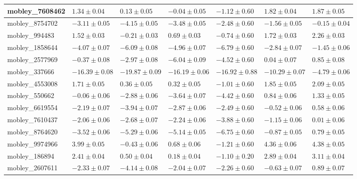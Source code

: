 \documentclass{article}
\begin{document}
\begin{landscape}
\begin{longtable}{|l{3.0cm}|l{3.0cm}|l{3.2cm}|l{3.6cm}|l{3.0cm}|l{3.0cm}|l{3.0cm}|}
mobley\_7608462	&	$	1.34	\pm	0.04	$	&	$	0.13	\pm	0.05	$	&	$	-0.04	\pm	0.05	$	&	$	-1.12	\pm	0.60	$	&	$	1.82	\pm	0.04	$	&	$	1.87	\pm	0.05	$	\\ \hline
mobley\_8754702	&	$	-3.11	\pm	0.05	$	&	$	-4.15	\pm	0.05	$	&	$	-3.48	\pm	0.05	$	&	$	-2.48	\pm	0.60	$	&	$	-1.56	\pm	0.05	$	&	$	-0.15	\pm	0.04	$	\\ \hline
mobley\_994483	&	$	1.52	\pm	0.03	$	&	$	-0.21	\pm	0.03	$	&	$	0.69	\pm	0.03	$	&	$	-0.74	\pm	0.60	$	&	$	1.72	\pm	0.03	$	&	$	2.26	\pm	0.03	$	\\ \hline
mobley\_1858644	&	$	-4.07	\pm	0.07	$	&	$	-6.09	\pm	0.08	$	&	$	-4.96	\pm	0.07	$	&	$	-6.79	\pm	0.60	$	&	$	-2.84	\pm	0.07	$	&	$	-1.45	\pm	0.06	$	\\ \hline
mobley\_2577969	&	$	-0.37	\pm	0.08	$	&	$	-2.97	\pm	0.08	$	&	$	-6.04	\pm	0.09	$	&	$	-4.52	\pm	0.60	$	&	$	0.04	\pm	0.07	$	&	$	0.85	\pm	0.08	$	\\ \hline
mobley\_337666	&	$	-16.39	\pm	0.08	$	&	$	-19.87	\pm	0.09	$	&	$	-16.19	\pm	0.06	$	&	$	-16.92	\pm	0.88	$	&	$	-10.29	\pm	0.07	$	&	$	-4.79	\pm	0.06	$	\\ \hline
mobley\_4553008	&	$	1.71	\pm	0.05	$	&	$	0.36	\pm	0.05	$	&	$	0.32	\pm	0.05	$	&	$	-1.01	\pm	0.60	$	&	$	1.85	\pm	0.05	$	&	$	2.09	\pm	0.05	$	\\ \hline
mobley\_550662	&	$	-0.06	\pm	0.06	$	&	$	-2.88	\pm	0.06	$	&	$	-3.64	\pm	0.07	$	&	$	-4.42	\pm	0.60	$	&	$	0.84	\pm	0.06	$	&	$	1.33	\pm	0.05	$	\\ \hline
mobley\_6619554	&	$	-2.19	\pm	0.07	$	&	$	-3.94	\pm	0.07	$	&	$	-2.87	\pm	0.06	$	&	$	-2.49	\pm	0.60	$	&	$	-0.52	\pm	0.06	$	&	$	0.58	\pm	0.06	$	\\ \hline
mobley\_7610437	&	$	-2.06	\pm	0.06	$	&	$	-2.68	\pm	0.07	$	&	$	-2.24	\pm	0.06	$	&	$	-3.88	\pm	0.60	$	&	$	-1.15	\pm	0.06	$	&	$	0.01	\pm	0.06	$	\\ \hline
mobley\_8764620	&	$	-3.52	\pm	0.06	$	&	$	-5.29	\pm	0.06	$	&	$	-5.14	\pm	0.05	$	&	$	-6.75	\pm	0.60	$	&	$	-0.87	\pm	0.05	$	&	$	0.79	\pm	0.05	$	\\ \hline
mobley\_9974966	&	$	3.99	\pm	0.05	$	&	$	-0.43	\pm	0.06	$	&	$	0.68	\pm	0.06	$	&	$	-1.21	\pm	0.60	$	&	$	4.36	\pm	0.06	$	&	$	4.38	\pm	0.05	$	\\ \hline
mobley\_186894	&	$	2.41	\pm	0.04	$	&	$	0.50	\pm	0.04	$	&	$	0.18	\pm	0.04	$	&	$	-1.10	\pm	0.20	$	&	$	2.89	\pm	0.04	$	&	$	3.11	\pm	0.04	$	\\ \hline
mobley\_2607611	&	$	-2.33	\pm	0.07	$	&	$	-4.14	\pm	0.08	$	&	$	-2.04	\pm	0.07	$	&	$	-2.26	\pm	0.60	$	&	$	-0.63	\pm	0.07	$	&	$	0.89	\pm	0.07	$	\\ \hline

\end{longtable}
\end{landscape}
\end{document}
